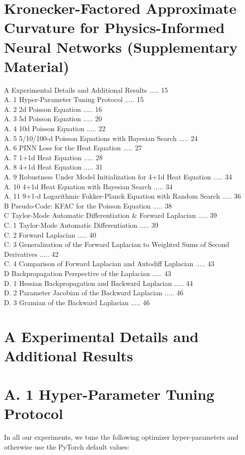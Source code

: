 \documentclass[10pt]{article}
\begin{document}
\section*{Kronecker-Factored Approximate Curvature for Physics-Informed Neural Networks (Supplementary Material) }
A Experimental Details and Additional Results ..... 15\\
A. 1 Hyper-Parameter Tuning Protocol ..... 15\\
A. 2 2d Poisson Equation ..... 16\\
A. 3 5d Poisson Equation ..... 20\\
A. 4 10d Poisson Equation ..... 22\\
A. 5 5/10/100-d Poisson Equations with Bayesian Search ..... 24\\
A. 6 PINN Loss for the Heat Equation ..... 27\\
A. 7 1+1d Heat Equation ..... 28\\
A. 8 4+1d Heat Equation ..... 31\\
A. 9 Robustness Under Model Initialization for 4+1d Heat Equation ..... 34\\
A. 10 4+1d Heat Equation with Bayesian Search ..... 34\\
A. 11 9+1-d Logarithmic Fokker-Planck Equation with Random Search ..... 36\\
B Pseudo-Code: KFAC for the Poisson Equation ..... 38\\
C Taylor-Mode Automatic Differentiation \& Forward Laplacian ..... 39\\
C. 1 Taylor-Mode Automatic Differentiation ..... 39\\
C. 2 Forward Laplacian ..... 40\\
C. 3 Generalization of the Forward Laplacian to Weighted Sums of Second Derivatives ..... 42\\
C. 4 Comparison of Forward Laplacian and Autodiff Laplacian ..... 43\\
D Backpropagation Perspective of the Laplacian ..... 43\\
D. 1 Hessian Backpropagation and Backward Laplacian ..... 44\\
D. 2 Parameter Jacobian of the Backward Laplacian ..... 46\\
D. 3 Gramian of the Backward Laplacian ..... 46

\section*{A Experimental Details and Additional Results}
\section*{A. 1 Hyper-Parameter Tuning Protocol}
In all our experiments, we tune the following optimizer hyper-parameters and otherwise use the PyTorch default values:
\end{document}
